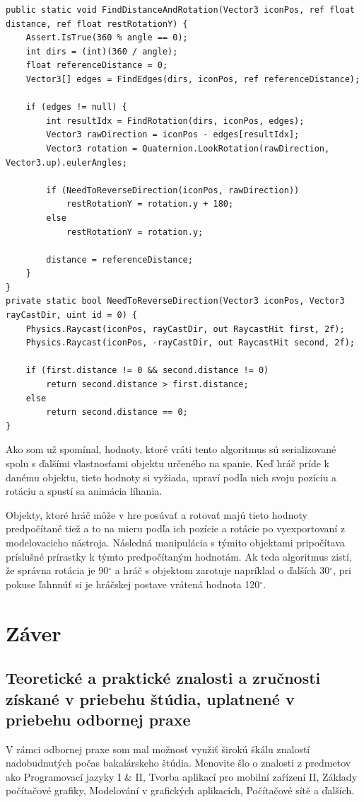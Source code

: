 \documentclass[slovak, bachelorpractice]{diploma}
\begin{document}
\vspace{10pt}
\begin{lstlisting}[label=src:entry,caption={Vstupný bod algoritmu na získanie rotácie a pozície postavy pri ležaní}]
public static void FindDistanceAndRotation(Vector3 iconPos, ref float distance, ref float restRotationY) {
    Assert.IsTrue(360 % angle == 0);
    int dirs = (int)(360 / angle);
    float referenceDistance = 0;
    Vector3[] edges = FindEdges(dirs, iconPos, ref referenceDistance);

    if (edges != null) {
        int resultIdx = FindRotation(dirs, iconPos, edges);
        Vector3 rawDirection = iconPos - edges[resultIdx];
        Vector3 rotation = Quaternion.LookRotation(rawDirection, Vector3.up).eulerAngles;

        if (NeedToReverseDirection(iconPos, rawDirection))
            restRotationY = rotation.y + 180;
        else
            restRotationY = rotation.y;

        distance = referenceDistance;
    }
}
private static bool NeedToReverseDirection(Vector3 iconPos, Vector3 rayCastDir, uint id = 0) {
    Physics.Raycast(iconPos, rayCastDir, out RaycastHit first, 2f);
    Physics.Raycast(iconPos, -rayCastDir, out RaycastHit second, 2f);

    if (first.distance != 0 && second.distance != 0)
        return second.distance > first.distance;
    else
        return second.distance == 0;
}
\end{lstlisting}

Ako som už spomínal, hodnoty, ktoré vráti tento algoritmus sú serializované spolu s ďalšími vlastnosťami objektu určeného na spanie. Keď hráč príde k danému objektu, tieto hodnoty si vyžiada, upraví podľa nich svoju pozíciu a rotáciu a spustí sa animácia líhania.

Objekty, ktoré hráč môže v hre posúvať a rotovať majú tieto hodnoty predpočítané tiež a to na mieru podľa ich pozície a rotácie po vyexportovaní z modelovacieho nástroja. Následná manipulácia s týmito objektami pripočítava príslušné prírastky k týmto predpočítaným hodnotám. Ak teda algoritmus zistí, že správna rotácia je 90$^{\circ}$ a hráč s objektom zarotuje napríklad o ďalších 30$^{\circ}$, pri pokuse ľahnnúť si je hráčskej postave vrátená hodnota 120$^{\circ}$.

\chapter{Záver}
\section{Teoretické a praktické znalosti a zručnosti získané v priebehu štúdia, uplatnené v priebehu odbornej praxe}
V rámci odbornej praxe som mal možnosť využiť širokú škálu znalostí nadobudnutých počas bakalárskeho štúdia. Menovite šlo o znalosti z predmetov ako Programovací jazyky I \& II, Tvorba aplikací pro mobilní zařízení II, Základy počítačové grafiky, Modelování v grafických aplikacích, Počítačové sítě a ďalších. 
\end{document}
